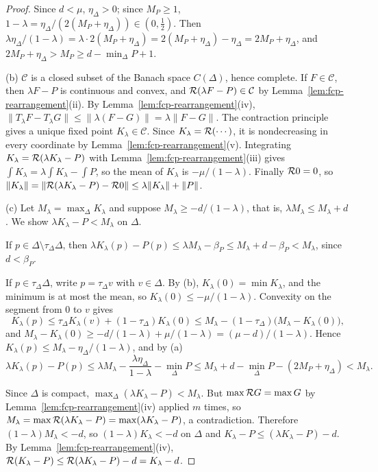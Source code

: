 \begin{proof}
Since $d<\mu$, $\eta_\Delta>0$; since $M_P\ge1$, $1-\lambda=\eta_\Delta/(2(M_P+\eta_\Delta))\in(0,\tfrac12)$. Then
$\lambda\eta_\Delta/(1-\lambda)=\lambda\cdot2(M_P+\eta_\Delta)=2(M_P+\eta_\Delta)-\eta_\Delta=2M_P+\eta_\Delta$, and
$2M_P+\eta_\Delta>M_P\ge d-\min_\Delta P+1$.

(b) $\mathcal C$ is a closed subset of the Banach space $C(\Delta)$, hence complete. If $F\in\mathcal C$, then
$\lambda F-P$ is continuous and convex, and $\mathcal{R}(\lambda F-P)\in\mathcal C$ by
Lemma~\ref{lem:fcp-rearrangement}(ii). By Lemma~\ref{lem:fcp-rearrangement}(iv),
$\|T_\lambda F-T_\lambda G\|\le\|\lambda(F-G)\|=\lambda\|F-G\|$. The contraction principle gives a unique fixed point
$K_\lambda\in\mathcal C$. Since $K_\lambda=\mathcal{R}(\cdots)$, it is nondecreasing in every coordinate by
Lemma~\ref{lem:fcp-rearrangement}(v). Integrating $K_\lambda=\mathcal{R}(\lambda K_\lambda-P)$ with
Lemma~\ref{lem:fcp-rearrangement}(iii) gives $\int K_\lambda=\lambda\int K_\lambda-\int P$, so the mean of $K_\lambda$ is
$-\mu/(1-\lambda)$. Finally $\mathcal{R}0=0$, so $\|K_\lambda\|=\|\mathcal{R}(\lambda K_\lambda-P)-\mathcal{R}0\|\le\lambda\|K_\lambda\|+\|P\|$.

(c) Let $M_\lambda=\max_\Delta K_\lambda$ and suppose $M_\lambda\ge-d/(1-\lambda)$, that is,
$\lambda M_\lambda\le M_\lambda+d$. We show $\lambda K_\lambda-P<M_\lambda$ on $\Delta$.

If $p\in\Delta\setminus\tau_\Delta\Delta$, then
$\lambda K_\lambda(p)-P(p)\le\lambda M_\lambda-\beta_P\le M_\lambda+d-\beta_P<M_\lambda$, since $d<\beta_P$.

If $p\in\tau_\Delta\Delta$, write $p=\tau_\Delta v$ with $v\in\Delta$. By (b), $K_\lambda(0)=\min K_\lambda$, and the
minimum is at most the mean, so $K_\lambda(0)\le-\mu/(1-\lambda)$. Convexity on the segment from $0$ to $v$ gives
\[
 K_\lambda(p)\le\tau_\Delta K_\lambda(v)+(1-\tau_\Delta)K_\lambda(0)\le M_\lambda-(1-\tau_\Delta)\bigl(M_\lambda-K_\lambda(0)\bigr),
\]
and $M_\lambda-K_\lambda(0)\ge-d/(1-\lambda)+\mu/(1-\lambda)=(\mu-d)/(1-\lambda)$. Hence
$K_\lambda(p)\le M_\lambda-\eta_\Delta/(1-\lambda)$, and by (a)
\[
 \lambda K_\lambda(p)-P(p)\le\lambda M_\lambda-\frac{\lambda\eta_\Delta}{1-\lambda}-\min_\Delta P
 \le M_\lambda+d-\min_\Delta P-(2M_P+\eta_\Delta)<M_\lambda .
\]

Since $\Delta$ is compact, $\max_\Delta(\lambda K_\lambda-P)<M_\lambda$. But $\max\mathcal{R} G=\max G$ by
Lemma~\ref{lem:fcp-rearrangement}(iv) applied $m$ times, so
$M_\lambda=\max\mathcal{R}(\lambda K_\lambda-P)=\max(\lambda K_\lambda-P)$, a contradiction. Therefore $(1-\lambda)M_\lambda<-d$,
so $(1-\lambda)K_\lambda<-d$ on $\Delta$ and $K_\lambda-P\le(\lambda K_\lambda-P)-d$. By
Lemma~\ref{lem:fcp-rearrangement}(iv), $\mathcal{R}(K_\lambda-P)\le\mathcal{R}(\lambda K_\lambda-P)-d=K_\lambda-d$.


\end{proof}
